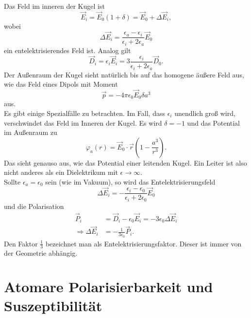 Das Feld im inneren der Kugel ist
\begin{equation*}
\vec{E}_i = \vec{E}_0(1+\delta) = \vec{E}_0 + \Delta\vec{E}_i,
\end{equation*}
wobei
\begin{equation*}
\Delta\vec{E}_i = \frac{\epsilon_a-\epsilon_i}{\epsilon_i+2\epsilon_a}\vec{E}_0
\end{equation*}
ein entelektrisierendes Feld ist. Analog gilt
\begin{equation*}
\vec{D}_i = \epsilon_i\vec{E}_i = 3\frac{\epsilon_i}{\epsilon_i+2\epsilon_a}\vec{D}_0.
\end{equation*}
Der Außenraum der Kugel sieht natürlich bis auf das homogene äußere Feld aus, wie das Feld eines Dipols mit Moment
\begin{equation*}
\vec{p} = -4\pi\epsilon_0\vec{E}_0\delta a^3
\end{equation*}
aus. \\
Es gibt einige Spezialfälle zu betrachten. Im Fall, dass $\epsilon_i$ unendlich groß wird, verschwindet das Feld im Inneren der Kugel. Es wird $\delta=-1$ und das Potential im Außenraum zu
\begin{equation*}
\varphi_a(r)=\vec{E}_0\cdot\vec{r}\left(1-\frac{a^3}{r^3}\right).
\end{equation*}
Das sieht genauso aus, wie das Potential einer leitenden Kugel. Ein Leiter ist also nicht anderes als ein Dielektrikum mit $\epsilon\rightarrow\infty$.\\
Sollte $\epsilon_a=\epsilon_0$ sein (wie im Vakuum), so wird das Entelektrisierungsfeld
\begin{equation*}
\Delta\vec{E}_i=-\frac{\epsilon_i-\epsilon_0}{\epsilon_i+2\epsilon_0}\vec{E}_0
\end{equation*}
und die Polarisation
\begin{align*}
\vec{P}_i &= \vec{D}_i - \epsilon_0\vec{E}_i = -3\epsilon_0\Delta\vec{E}_i\\
\Rightarrow \Delta\vec{E}_i &= -\frac{1}{3\epsilon_0}\vec{P}_i.
\end{align*}
Den Faktor $\frac{1}{3}$ bezeichnet man als Entelektrisierungsfaktor. Dieser ist immer von der Geometrie abhängig. 

\section{Atomare Polarisierbarkeit und Suszeptibilität}

